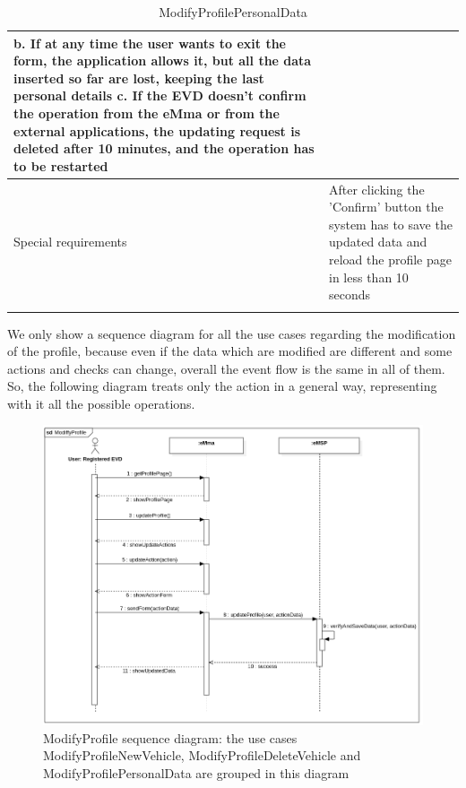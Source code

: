 \begin{center}
\begin{longtable}{p{4cm} p{11cm}}
        b. If at any time the user wants to exit the form, the application allows it, but all the data inserted so far are lost, keeping the last personal details \newline
        c. If the EVD doesn't confirm the operation from the eMma or from the external applications, the updating request is deleted after 10 minutes, and the operation has to be restarted \\
     \hline
     Special requirements & After clicking the 'Confirm' button the system has to save the updated data and reload the profile page in less than 10 seconds \\
     \hline
    \caption{ModifyProfilePersonalData}
    \label{tab:ModifyProfilePersonalData}
    \end{longtable}
\end{center}

We only show a sequence diagram for all the use cases regarding the modification of the profile, because even if the data which are modified are different and some actions and checks can change, overall the event flow is the same in all of them. So, the following diagram treats only the action in a general way, representing with it all the possible operations. 
\begin{figure}[H]
    \centering
    \includegraphics[width=1\textwidth]{Images/cp3/ModifyProfileSD.png}
    \caption{ModifyProfile sequence diagram: the use cases ModifyProfileNewVehicle, ModifyProfileDeleteVehicle and ModifyProfilePersonalData are grouped in this diagram}
\end{figure}

